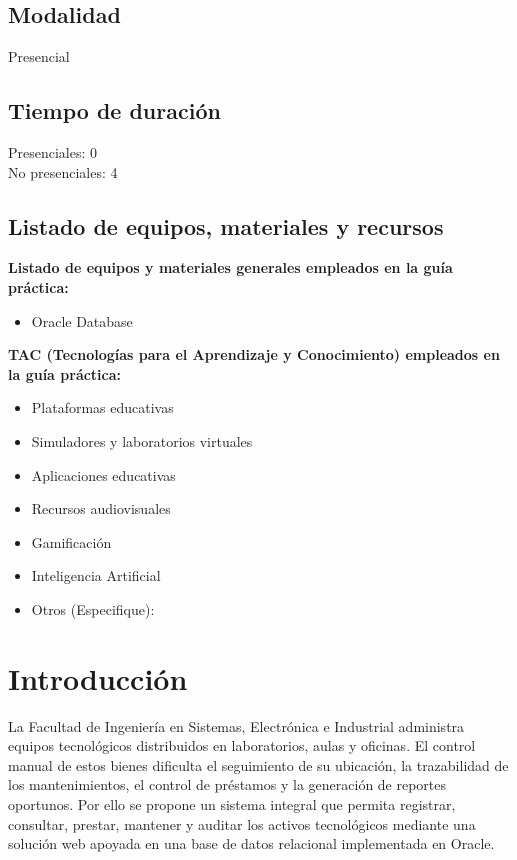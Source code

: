 \documentclass{article}
\begin{document}
\subsection{Modalidad}
Presencial

\subsection{Tiempo de duración}

Presenciales: 0\\
No presenciales: 4




\subsection{Listado de equipos, materiales y recursos}
\textbf{Listado de equipos y materiales generales empleados en la guía práctica:}
\begin{itemize}
    \item Oracle Database
\end{itemize}

\textbf{TAC (Tecnologías para el Aprendizaje y Conocimiento) empleados en la guía práctica:}
\begin{itemize}
    \item[$\square$] Plataformas educativas
    \item[$\square$] Simuladores y laboratorios virtuales
    \item[$\square$] Aplicaciones educativas
    \item[$\square$] Recursos audiovisuales
    \item[$\square$] Gamificación
    \item[$\square$] Inteligencia Artificial
    \item Otros (Especifique): \underline{\hspace{5cm}}
\end{itemize}




\section{Introducción}

La Facultad de Ingeniería en Sistemas, Electrónica e Industrial administra equipos tecnológicos distribuidos en laboratorios, aulas y oficinas. El control manual de estos bienes dificulta el seguimiento de su ubicación, la trazabilidad de los mantenimientos, el control de préstamos y la generación de reportes oportunos. Por ello se propone un sistema integral que permita registrar, consultar, prestar, mantener y auditar los activos tecnológicos mediante una solución web apoyada en una base de datos relacional implementada en Oracle.
\end{document}
